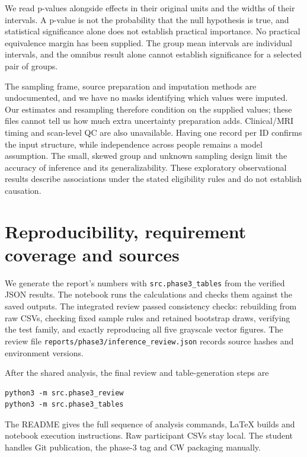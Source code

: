 \documentclass[11pt]{article}
\begin{document}
We read p-values alongside effects in their original units and the widths
of their intervals. A p-value is not the probability that the null
hypothesis is true, and statistical significance alone does not establish
practical importance. No practical equivalence margin has been supplied.
The group mean intervals are individual intervals, and the omnibus result
alone cannot establish significance for a selected pair of groups.

The sampling frame, source preparation and imputation methods are
undocumented, and we have no masks identifying which values were imputed.
Our estimates and resampling therefore condition on the supplied values;
these files cannot tell us how much extra uncertainty preparation adds.
Clinical/MRI timing and scan-level QC are also unavailable. Having one
record per ID confirms the input structure, while independence across
people remains a model assumption. The small, skewed group and unknown
sampling design limit the accuracy of inference and its generalizability.
These exploratory observational results describe associations under the
stated eligibility rules and do not establish causation.

\clearpage
\section{Reproducibility, requirement coverage and sources}
We generate the report's numbers with \texttt{src.phase3\_tables}
from the verified JSON results. The notebook runs the calculations and
checks them against the saved outputs. The integrated review passed
\ReviewCount{} consistency checks: rebuilding from raw CSVs, checking
fixed sample rules and retained bootstrap draws, verifying the test family,
and exactly reproducing all five grayscale vector figures. The review file
\texttt{reports/phase3/inference\_review.json}
records source hashes and environment versions.

After the shared analysis, the final review and table-generation steps are
\begin{verbatim}
python3 -m src.phase3_review
python3 -m src.phase3_tables
\end{verbatim}
The README gives the full sequence of analysis commands,
LaTeX builds and notebook execution instructions. Raw participant CSVs
stay local. The student handles Git publication, the phase-3 tag and
CW packaging manually.
\end{document}

